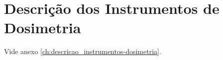 \chapter{Descrição dos Instrumentos de Dosimetria}
Vide anexo \ref{ch:descricao_instrumentos-dosimetria}.